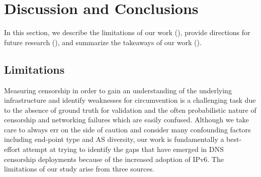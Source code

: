 \section{Discussion and Conclusions} \label{sec:discussion}

In this section, we describe the limitations of our work
(), provide directions for future research
(), and summarize the takeaways of our work
().

%

\subsection{Limitations}
\label{sec:discussion:limitations}
Measuring censorship in order to gain an understanding of the underlying
infrastructure and identify weaknesses for circumvention is a challenging task
due to the absence of ground truth for validation and the often probabilistic
nature of censorship and networking failures which are easily confused.
%
Although we take care to always err on the side of caution and consider many
confounding factors including end-point type and AS diversity, our work is
fundamentally a best-effort attempt at trying to identify the gaps that have
emerged in DNS censorship deployments because of the increased adoption of
IPv6. The limitations of our study arise from three sources.

